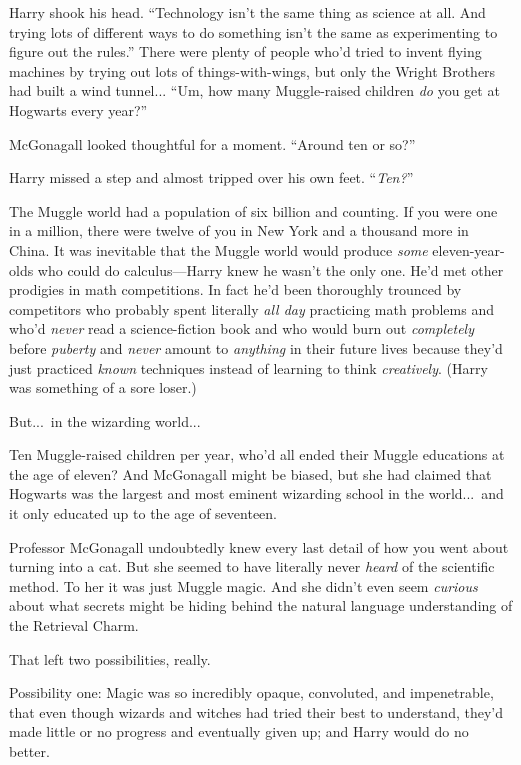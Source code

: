 Harry shook his head. “Technology isn’t the same thing as science at all. And trying lots of different ways to do something isn’t the same as experimenting to figure out the rules.” There were plenty of people who’d tried to invent flying machines by trying out lots of things-with-wings, but only the Wright Brothers had built a wind tunnel... “Um, how many Muggle-raised children \emph{do} you get at Hogwarts every year?”

McGonagall looked thoughtful for a moment. “Around ten or so?”

Harry missed a step and almost tripped over his own feet. “\emph{Ten?}”

The Muggle world had a population of six billion and counting. If you were one in a million, there were twelve of you in New York and a thousand more in China. It was inevitable that the Muggle world would produce \emph{some} eleven-year-olds who could do calculus—Harry knew he wasn’t the only one. He’d met other prodigies in math competitions. In fact he’d been thoroughly trounced by competitors who probably spent literally \emph{all day} practicing math problems and who’d \emph{never} read a science-fiction book and who would burn out \emph{completely} before \emph{puberty} and \emph{never} amount to \emph{anything} in their future lives because they’d just practiced \emph{known} techniques instead of learning to think \emph{creatively}. (Harry was something of a sore loser.)

But...\ in the wizarding world...

Ten Muggle-raised children per year, who’d all ended their Muggle educations at the age of eleven? And McGonagall might be biased, but she had claimed that Hogwarts was the largest and most eminent wizarding school in the world...\ and it only educated up to the age of seventeen.

Professor McGonagall undoubtedly knew every last detail of how you went about turning into a cat. But she seemed to have literally never \emph{heard} of the scientific method. To her it was just Muggle magic. And she didn’t even seem \emph{curious} about what secrets might be hiding behind the natural language understanding of the Retrieval Charm.

That left two possibilities, really.

Possibility one: Magic was so incredibly opaque, convoluted, and impenetrable, that even though wizards and witches had tried their best to understand, they’d made little or no progress and eventually given up; and Harry would do no better.

